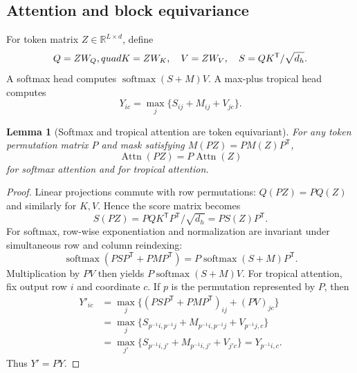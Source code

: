 \documentclass[11pt]{article}
\theoremstyle{definition}
\theoremstyle{plain}
\newtheorem{lemma}[definition]{Lemma}
\theoremstyle{remark}
\numberwithin{equation}{section}
\newcommand{\R}{\mathbb{R}}
\newcommand{\softmax}{\operatorname{softmax}}
\newcommand{\transpose}{^{\mathsf T}}
\begin{document}
\subsection{Attention and block equivariance}

For token matrix $Z\in\R^{L\times d}$, define
\begin{equation}
  Q=ZW_Q,\\quad K=ZW_K,
  \quad V=ZW_V,
  \quad S=QK\transpose/\sqrt{d_h}.
\end{equation}
A softmax head computes $\softmax(S+M)V$.  A max-plus tropical head computes
\begin{equation}
  Y_{ic}=\max_j\{S_{ij}+M_{ij}+V_{jc}\}.
\end{equation}

\begin{lemma}[Softmax and tropical attention are token equivariant]
For any token permutation matrix $P$ and mask satisfying $M(PZ)=PM(Z)P\transpose$,
\begin{equation}
  \operatorname{Attn}(PZ)=P\operatorname{Attn}(Z)
\end{equation}
for softmax attention and for tropical attention.
\end{lemma}

\begin{proof}
Linear projections commute with row permutations: $Q(PZ)=PQ(Z)$ and similarly for $K,V$.  Hence the score matrix becomes
\begin{equation}
  S(PZ)=PQK\transpose P\transpose/\sqrt{d_h}=PS(Z)P\transpose.
\end{equation}
For softmax, row-wise exponentiation and normalization are invariant under simultaneous row and column reindexing:
\begin{equation}
  \softmax(PSP\transpose+PMP\transpose)=P\softmax(S+M)P\transpose.
\end{equation}
Multiplication by $PV$ then yields $P\softmax(S+M)V$.  For tropical attention, fix output row $i$ and coordinate $c$.  If $p$ is the permutation represented by $P$, then
\begin{align}
  Y'_{ic}
  &=\max_j\{(PSP\transpose+PMP\transpose)_{ij}+(PV)_{jc}\}\\
  &=\max_j\{S_{p^{-1}i,p^{-1}j}+M_{p^{-1}i,p^{-1}j}+V_{p^{-1}j,c}\}\\
  &=\max_{j'}\{S_{p^{-1}i,j'}+M_{p^{-1}i,j'}+V_{j'c}\}=Y_{p^{-1}i,c}.
\end{align}
Thus $Y'=PY$.
\end{proof}
\end{document}
